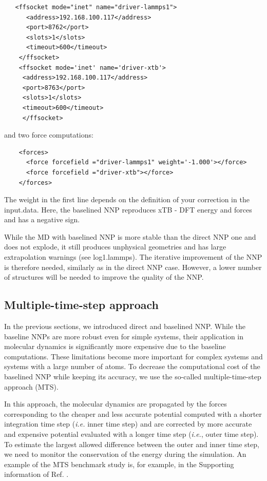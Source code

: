 \documentclass[12pt]{article}
\begin{document}
\begin{verbatim}
   <ffsocket mode="inet" name="driver-lammps1">
      <address>192.168.100.117</address>
      <port>8762</port>
      <slots>1</slots>
      <timeout>600</timeout>
    </ffsocket>
    <ffsocket mode='inet' name='driver-xtb'>
     <address>192.168.100.117</address>
     <port>8763</port>
     <slots>1</slots>
     <timeout>600</timeout>
     </ffsocket>

\end{verbatim}

and two force computations:

\begin{verbatim}
    <forces>
      <force forcefield ="driver-lammps1" weight='-1.000'></force>
      <force forcefield ="driver-xtb"></force>
    </forces>
\end{verbatim}

The weight in the first line depends on the definition of your correction in the input.data. Here, the baselined NNP reproduces xTB - DFT energy and forces and has a negative sign.

While the MD with baselined NNP is more stable than the direct NNP one and does not explode, it still produces unphysical geometries and has large extrapolation warnings (see log1.lammps). The iterative improvement of the NNP is therefore needed, similarly as in the direct NNP case. However, a lower number of structures will be needed to improve the quality of the NNP.

\subsection{Multiple-time-step approach}

In the previous sections, we introduced direct and baselined NNP. While the baseline NNPs are more robust even for simple systems, their application in molecular dynamics is significantly more expensive due to the baseline computations. These limitations become more important for complex systems and systems with a large number of atoms. 
To decrease the computational cost of the baselined NNP while keeping its accuracy, we use the so-called multiple-time-step approach (MTS).\cite{guid+08jcp,Luehr2014,Liberatore2018,Kapil2016}  

In this approach, the molecular dynamics are propagated by the forces corresponding to the cheaper and less accurate potential computed with a shorter integration time step (\textit{i.e.} inner time step) and are corrected by more accurate and expensive potential evaluated with a longer time step (\textit{i.e.}, outer time step). To estimate the largest allowed difference between the outer and inner time step, we need to monitor the conservation of the energy during the simulation. An example of the MTS benchmark study is, for example, in the Supporting information of Ref. .
\end{document}
